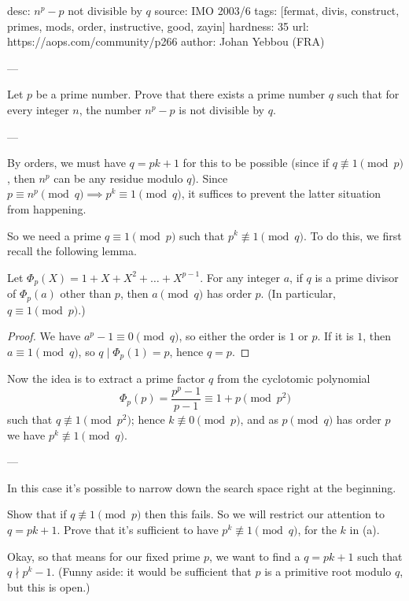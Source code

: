desc:  $n^p-p$ not divisible by $q$
source: IMO 2003/6
tags:  [fermat, divis, construct, primes, mods, order, instructive, good, zayin]
hardness: 35
url: https://aops.com/community/p266
author: Johan Yebbou (FRA)

---

Let $p$ be a prime number.
Prove that there exists a prime number $q$ such that for every integer $n$,
the number $n^p-p$ is not divisible by $q$.

---

By orders, we must have $q=pk+1$ for this to be possible
(since if $q \not \equiv 1 \pmod p$, then $n^p$ can be any residue modulo $q$).
Since $p \equiv n^p \pmod q \implies p^k \equiv 1 \pmod q$,
it suffices to prevent the latter situation from happening.

So we need a prime $q \equiv 1 \pmod p$ such that $p^k \not\equiv 1 \pmod q$.
To do this, we first recall the following lemma.
\begin{lemma*}
  Let $\Phi_p(X) = 1 + X + X^2 + \dots + X^{p-1}$.
  For any integer $a$, if $q$ is a prime divisor of $\Phi_p(a)$ other than $p$,
  then $a \pmod q$ has order $p$. (In particular, $q \equiv 1 \pmod p$.)
\end{lemma*}
\begin{proof}
  We have $a^p-1 \equiv 0 \pmod q$, so either the order is $1$ or $p$.
  If it is $1$, then $a \equiv 1 \pmod q$, so $q \mid \Phi_p(1) = p$, hence $q = p$.
\end{proof}

Now the idea is to extract a prime factor $q$
from the cyclotomic polynomial
\[ \Phi_p(p) = \frac{p^p-1}{p-1} \equiv 1+p \pmod{p^2} \]
such that $q \not\equiv 1 \pmod{p^2}$;
hence $k \not\equiv 0 \pmod p$,
and as $p \pmod q$ has order $p$ we have $p^k \not\equiv 1 \pmod q$.

---

In this case it's possible to narrow down the search
space right at the beginning.
\begin{walk}
  \ii Show that if $q \not\equiv 1 \pmod p$ then this fails.
  So we will restrict our attention
  to $q = pk + 1$.
  \ii Prove that it's sufficient to have
  $p^k \not\equiv 1 \pmod q$, for the $k$ in (a).
\end{walk}
Okay, so that means for our fixed prime $p$,
we want to find a $q = pk+1$ such that $q \nmid p^k-1$.
(Funny aside: it would be sufficient that $p$
is a primitive root modulo $q$, but this is open.)

